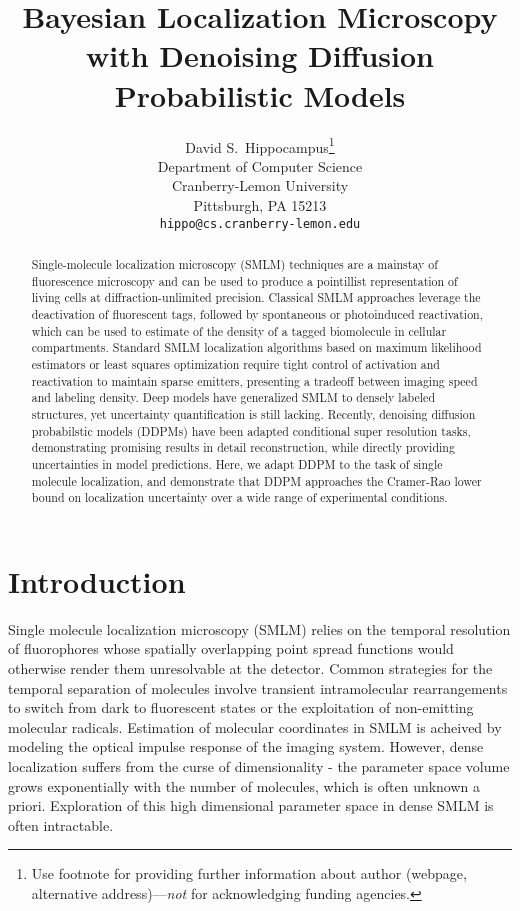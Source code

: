 \documentclass{article}
\title{Bayesian Localization Microscopy with Denoising Diffusion Probabilistic Models}
\author{%
  David S.~Hippocampus\thanks{Use footnote for providing further information
    about author (webpage, alternative address)---\emph{not} for acknowledging
    funding agencies.} \\
  Department of Computer Science\\
  Cranberry-Lemon University\\
  Pittsburgh, PA 15213 \\
  \texttt{hippo@cs.cranberry-lemon.edu} \\
}
\begin{document}
\maketitle


\begin{abstract}
Single-molecule localization microscopy (SMLM) techniques are a mainstay of fluorescence microscopy and can be used to produce a pointillist representation of living cells at diffraction-unlimited precision. Classical SMLM approaches leverage the deactivation of fluorescent tags, followed by spontaneous or photoinduced reactivation, which can be used to estimate of the density of a tagged biomolecule in cellular compartments. Standard SMLM localization algorithms based on maximum likelihood estimators or least squares optimization require tight control of activation and reactivation to maintain sparse emitters, presenting a tradeoff between imaging speed and labeling density. Deep models have generalized SMLM to densely labeled structures, yet uncertainty quantification is still lacking. Recently, denoising diffusion probabilstic models (DDPMs) have been adapted conditional super resolution tasks, demonstrating promising results in detail reconstruction, while directly providing uncertainties in model predictions. Here, we adapt DDPM to the task of single molecule localization, and demonstrate that DDPM approaches the Cramer-Rao lower bound on localization uncertainty over a wide range of experimental conditions.
\end{abstract}

\section{Introduction}
Single molecule localization microscopy (SMLM) relies on the temporal resolution of fluorophores whose spatially overlapping point spread functions would otherwise render them unresolvable at the detector. Common strategies for the temporal separation of molecules involve transient intramolecular rearrangements to switch from dark to fluorescent states or the exploitation of non-emitting molecular radicals. Estimation of molecular coordinates in SMLM is acheived by modeling the optical impulse response of the imaging system. However, dense localization suffers from the curse of dimensionality - the parameter space volume grows exponentially with the number of molecules, which is often unknown a priori. Exploration of this high dimensional parameter space in dense SMLM is often intractable. 
\end{document}

